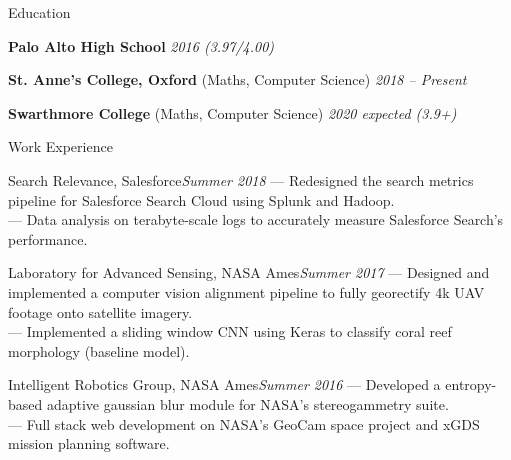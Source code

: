 \documentclass{resume} %
\begin{document}

\begin{rSection}{Education}

	{ \textbf{Palo Alto High School}} \hfill {\em 2016 (3.97/4.00)} 

	{ \textbf{St. Anne's College, Oxford} (Maths, Computer Science)} \hfill {\em 2018 -- Present} 

	{ \textbf{Swarthmore College} (Maths, Computer Science)} \hfill {\em 2020 expected (3.9+)} 
\end{rSection}

\begin{rSection}{Work Experience}
	{
		\begin{rSubsection}{Search Relevance, Salesforce}{\em Summer 2018}{}{}
			--- Redesigned the search metrics pipeline for Salesforce Search Cloud using Splunk and Hadoop. \\
			--- Data analysis on terabyte-scale logs to accurately measure Salesforce Search's performance.
		\end{rSubsection}
	
	}
	{
		\begin{rSubsection}{Laboratory for Advanced Sensing, NASA Ames}{\em Summer 2017}{}{}
			--- Designed and implemented a computer vision alignment pipeline to fully georectify 4k UAV footage onto satellite imagery. \\
			--- Implemented a sliding window CNN using Keras to classify coral reef morphology (baseline model).
		\end{rSubsection}
	}

	{
		\begin{rSubsection}{Intelligent Robotics Group, NASA Ames}{\em Summer 2016}{}{}
			--- Developed a entropy-based adaptive gaussian blur module for NASA's stereogammetry suite. \\
			--- Full stack web development on NASA's GeoCam space project and xGDS mission planning software.
		\end{rSubsection}
	}
\end{rSection}  %
\end{document}
